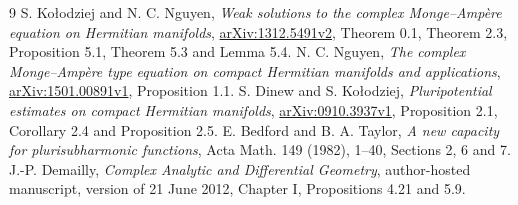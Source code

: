 \documentclass[11pt]{article}
\theoremstyle{remark}\newtheorem{remark}[theorem]{Remark}
\begin{document}
\begin{thebibliography}{9}
 S. Ko\l odziej and N. C. Nguyen,
\emph{Weak solutions to the complex Monge--Amp\`ere equation on Hermitian
manifolds}, \href{https://arxiv.org/abs/1312.5491v2}{arXiv:1312.5491v2},
Theorem 0.1, Theorem 2.3, Proposition 5.1, Theorem 5.3 and Lemma 5.4.
 N. C. Nguyen,
\emph{The complex Monge--Amp\`ere type equation on compact Hermitian
manifolds and applications},
\href{https://arxiv.org/abs/1501.00891v1}{arXiv:1501.00891v1}, Proposition 1.1.
 S. Dinew and S. Ko\l odziej,
\emph{Pluripotential estimates on compact Hermitian manifolds},
\href{https://arxiv.org/abs/0910.3937v1}{arXiv:0910.3937v1},
Proposition 2.1, Corollary 2.4 and Proposition 2.5.
 E. Bedford and B. A. Taylor,
\emph{A new capacity for plurisubharmonic functions}, Acta Math.
149 (1982), 1--40, Sections 2, 6 and 7.
 J.-P. Demailly,
\emph{Complex Analytic and Differential Geometry}, author-hosted
manuscript, version of 21 June 2012, Chapter I, Propositions 4.21 and 5.9.
\end{thebibliography}
\end{document}
